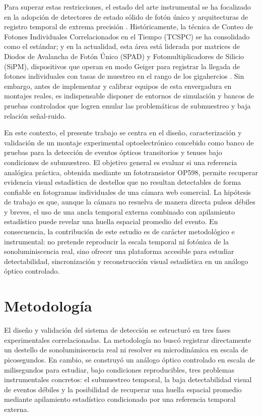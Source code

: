 \documentclass[10pt,a4paper,twocolumn]{article}
\begin{document}
Para superar estas restricciones, el estado del arte instrumental se ha focalizado en la adopción de detectores de estado sólido de fotón único y arquitecturas de registro temporal de extrema precisión \cite{becker2005}. Históricamente, la técnica de Conteo de Fotones Individuales Correlacionados en el Tiempo (TCSPC) se ha consolidado como el estándar; y en la actualidad, esta área está liderada por matrices de Diodos de Avalancha de Fotón Único (SPAD) y Fotomultiplicadores de Silicio (SiPM), dispositivos que operan en modo Geiger para registrar la llegada de fotones individuales con tasas de muestreo en el rango de los gigahercios \cite{bruschini2019, mccarthy2013}. Sin embargo, antes de implementar y calibrar equipos de esta envergadura en montajes reales, es indispensable disponer de entornos de simulación y bancos de pruebas controlados que logren emular las problemáticas de submuestreo y baja relación señal-ruido.

En este contexto, el presente trabajo se centra en el diseño, caracterización y validación de un montaje experimental optoelectrónico concebido como banco de pruebas para la detección de eventos ópticos transitorios y tenues bajo condiciones de submuestreo. El objetivo general es evaluar si una referencia analógica práctica, obtenida mediante un fototransistor OP598, permite recuperar evidencia visual estadística de destellos que no resultan detectables de forma confiable en fotogramas individuales de una cámara web comercial. La hipótesis de trabajo es que, aunque la cámara no resuelva de manera directa pulsos débiles y breves, el uso de una ancla temporal externa combinado con apilamiento estadístico puede revelar una huella espacial promedio del evento. En consecuencia, la contribución de este estudio es de carácter metodológico e instrumental: no pretende reproducir la escala temporal ni fotónica de la sonoluminiscencia real, sino ofrecer una plataforma accesible para estudiar detectabilidad, sincronización y reconstrucción visual estadística en un análogo óptico controlado.

\section{Metodología}

El diseño y validación del sistema de detección se estructuró en tres fases experimentales correlacionadas. La metodología no buscó registrar directamente un destello de sonoluminiscencia real ni resolver su microdinámica en escala de picosegundos. En cambio, se construyó un análogo óptico controlado en escala de milisegundos para estudiar, bajo condiciones reproducibles, tres problemas instrumentales concretos: el submuestreo temporal, la baja detectabilidad visual de eventos débiles y la posibilidad de recuperar una huella espacial promedio mediante apilamiento estadístico condicionado por una referencia temporal externa.
\end{document}
